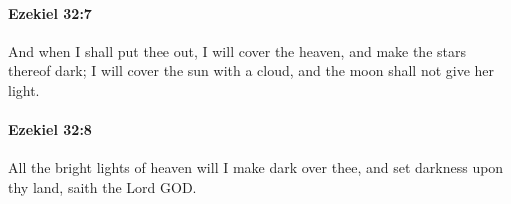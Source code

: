 		\paragraph{Ezekiel 32:7} %
			\label{EZEKIEL-32-7}

			And when I shall put thee out, I will cover the heaven, and make the stars thereof dark; I will cover the sun with a cloud, and the moon shall not give her light.


		\paragraph{Ezekiel 32:8} %
			\label{EZEKIEL-32-8}

			All the bright lights of heaven will I make dark over thee, and set darkness upon thy land, saith the Lord GOD.


